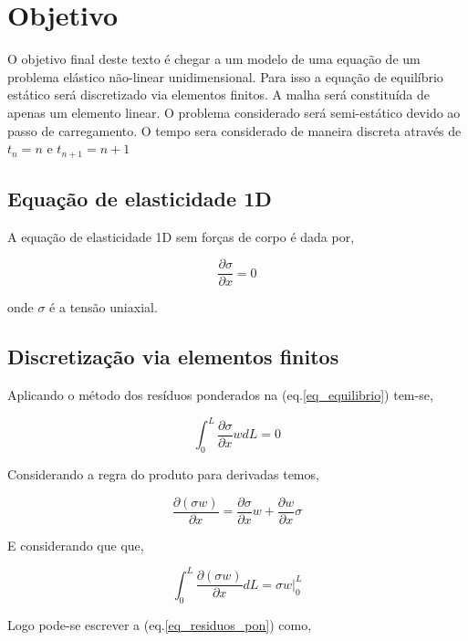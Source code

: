\documentclass[12pt,a4paper]{article}
\newcommand{\diff}[1]{d#1}
\newcommand{\dd}[2]{\frac{\partial #1}{\partial #2}}
\begin{document}
	
\section{Objetivo}

O objetivo final deste texto é chegar a um modelo de uma equação de um problema elástico não-linear unidimensional. Para isso a equação de equilíbrio estático será discretizado via elementos finitos. A malha será constituída de apenas um elemento linear. O problema considerado será semi-estático devido ao passo de carregamento. O tempo sera considerado de maneira discreta através de $t_n = n$ e $t_{n+1} = n+1$


\subsection{Equação de elasticidade 1D}

A equação de elasticidade 1D sem forças de corpo é dada por,

\begin{equation}
	\dd{\sigma}{x} = 0
	\label{eq_equilibrio}
\end{equation}
	
\noindent
onde $\sigma$ é a tensão uniaxial.

\subsection{Discretização via elementos finitos}

Aplicando o método dos resíduos ponderados na (eq.\ref{eq_equilibrio}) tem-se,

\begin{equation}
\int_0^L{\dd{\sigma}{x}w\diff{L}} = 0
\label{eq_residuos_pon}
\end{equation} 

Considerando a regra do produto para derivadas temos,

\begin{equation}
\dd{(\sigma w)}{x} = \dd{\sigma}{x}w + \dd{w}{x}\sigma
\end{equation} 
 
E considerando que que,

\begin{equation}
\int_0^L \dd{(\sigma w)}{x} \diff{L} = \sigma w |_0^L
\end{equation} 
 
Logo pode-se escrever a (eq.\ref{eq_residuos_pon}) como,
\end{document}
